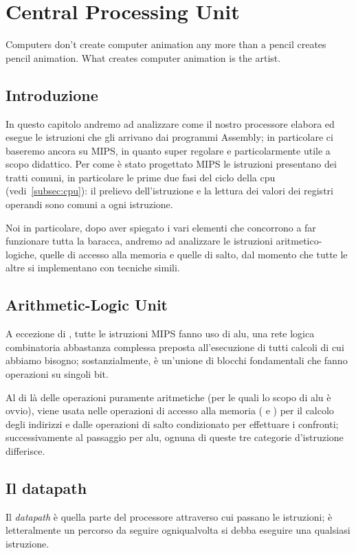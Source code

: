 \documentclass[class=book, crop=false, oneside]{standalone}
\begin{document}
\chapter{Central Processing Unit}\begin{fquote}Computers don't create computer animation any more than a pencil creates pencil animation. What creates computer animation is the artist.
 \end{fquote}

\section{Introduzione}
In questo capitolo andremo ad analizzare come il nostro processore elabora ed esegue le istruzioni che gli arrivano dai programmi Assembly; in particolare ci baseremo ancora su MIPS, in quanto super regolare e particolarmente utile a scopo didattico. Per come è stato progettato MIPS le istruzioni presentano dei tratti comuni, in particolare le prime due fasi del ciclo della \acrshort{cpu} (vedi~\ref{subsec:cpu}): il prelievo dell'istruzione e la lettura dei valori dei registri operandi sono comuni a ogni istruzione.

Noi in particolare, dopo aver spiegato i vari elementi che concorrono a far funzionare tutta la baracca, andremo ad analizzare le istruzioni aritmetico-logiche, quelle di accesso alla memoria e quelle di salto, dal momento che tutte le altre si implementano con tecniche simili.

\section{Arithmetic-Logic Unit}
A eccezione di , tutte le istruzioni MIPS fanno uso di \acrfull{alu}, una rete logica combinatoria abbastanza complessa preposta all'esecuzione di tutti calcoli di cui abbiamo bisogno; sostanzialmente, è un’unione di blocchi fondamentali che fanno operazioni su singoli bit.

Al di là delle operazioni puramente aritmetiche (per le quali lo scopo di \acrshort{alu} è ovvio), viene usata nelle operazioni di accesso alla memoria ( e ) per il calcolo degli indirizzi e dalle operazioni di salto condizionato per effettuare i confronti; successivamente al passaggio per \acrshort{alu}, ognuna di queste tre categorie d'istruzione differisce.

\section{Il datapath}
Il \emph{datapath} è quella parte del processore attraverso cui passano le istruzioni; è letteralmente un percorso da seguire ogniqualvolta si debba eseguire una qualsiasi istruzione.
\end{document}
